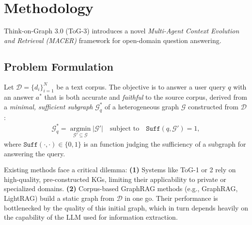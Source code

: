 

\section{Methodology}
\label{sec:method}

Think-on-Graph 3.0 (ToG-3) introduces a novel \emph{Multi-Agent Context Evolution and Retrieval (MACER)} framework for open-domain question answering. 

\subsection{Problem Formulation}
\label{subsec:problem}

Let $\mathcal{D}=\{d_i\}_{i=1}^N$ be a text corpus. The objective is to answer a user query $q$ with an answer $a^*$ that is both accurate and \emph{faithful} to the source corpus, derived from a \emph{minimal, sufficient subgraph} $\mathcal{G}^*_q$ of a heterogeneous graph $\mathcal{G}$ constructed from $\mathcal{D}$:
\begin{align}
    \mathcal{G}^*_q = \operatorname*{argmin}_{\mathcal{G}' \subseteq \mathcal{G}} |\mathcal{G}'| \quad \text{subject to} \quad \texttt{Suff}(q, \mathcal{G}') = 1,
\end{align}
where $\texttt{Suff}(\cdot, \cdot) \in \{0,1\}$ is an function judging the sufficiency of a subgraph for answering the query.

Existing methods face a critical dilemma: \textbf{(1)} Systems like ToG-1 or 2 rely on high-quality, pre-constructed KGs, limiting their applicability to private or specialized domains. \textbf{(2)} Corpus-based GraphRAG methods (e.g., GraphRAG, LightRAG) build a static graph from $\mathcal{D}$ in one go. Their performance is bottlenecked by the quality of this initial graph, which in turn depends heavily on the capability of the LLM used for information extraction. 

